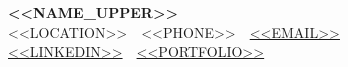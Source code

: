 
\begin{center}
  {\LARGE\bfseries <<NAME_UPPER>>}\\[3pt]
  <<LOCATION>> \,\textbar\, <<PHONE>> \,\textbar\,
  \href{mailto:<<EMAIL>>}{<<EMAIL>>}\\[1pt]
  \href{https://<<LINKEDIN>>}{<<LINKEDIN>>}
  \,\textbar\,
  \href{https://<<PORTFOLIO>>}{<<PORTFOLIO>>}
\end{center}
\vspace{-4pt}
